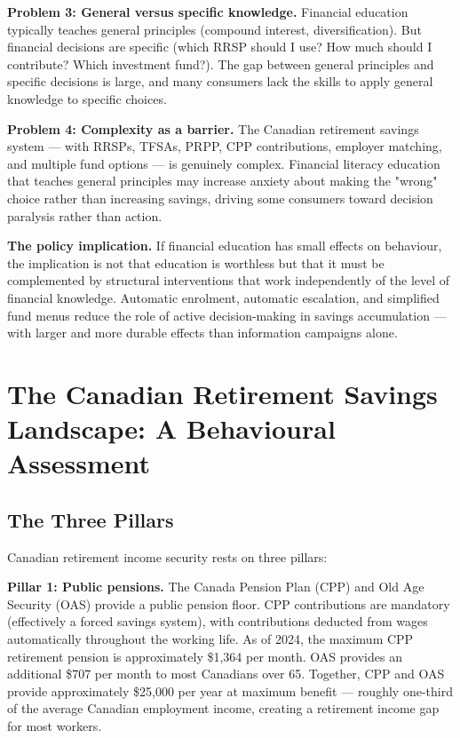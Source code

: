 \documentclass[12pt, letterpaper]{article}
\begin{document}
\textbf{Problem 3: General versus specific knowledge.} Financial education typically teaches general principles (compound interest, diversification). But financial decisions are specific (which RRSP should I use? How much should I contribute? Which investment fund?). The gap between general principles and specific decisions is large, and many consumers lack the skills to apply general knowledge to specific choices.

\textbf{Problem 4: Complexity as a barrier.} The Canadian retirement savings system --- with RRSPs, TFSAs, PRPP, CPP contributions, employer matching, and multiple fund options --- is genuinely complex. Financial literacy education that teaches general principles may increase anxiety about making the "wrong" choice rather than increasing savings, driving some consumers toward decision paralysis rather than action.

\textbf{The policy implication.} If financial education has small effects on behaviour, the implication is not that education is worthless but that it must be complemented by structural interventions that work independently of the level of financial knowledge. Automatic enrolment, automatic escalation, and simplified fund menus reduce the role of active decision-making in savings accumulation --- with larger and more durable effects than information campaigns alone.

\medskip


\section{The Canadian Retirement Savings Landscape: A Behavioural Assessment}



\subsection{The Three Pillars}


Canadian retirement income security rests on three pillars:

\textbf{Pillar 1: Public pensions.} The Canada Pension Plan (CPP) and Old Age Security (OAS) provide a public pension floor. CPP contributions are mandatory (effectively a forced savings system), with contributions deducted from wages automatically throughout the working life. As of 2024, the maximum CPP retirement pension is approximately \$1,364 per month. OAS provides an additional \$707 per month to most Canadians over 65. Together, CPP and OAS provide approximately \$25,000 per year at maximum benefit --- roughly one-third of the average Canadian employment income, creating a retirement income gap for most workers.
\end{document}
